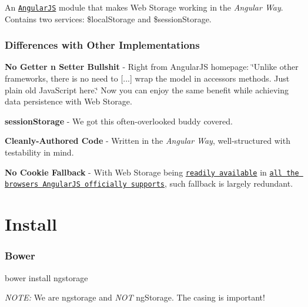 \href{https://travis-ci.org/gsklee/ngStorage}{\tt } \href{https://david-dm.org/gsklee/ngStorage}{\tt } \href{https://david-dm.org/gsklee/ngStorage#info=devDependencies}{\tt }

An \href{https://github.com/angular/angular.js}{\tt Angular\+JS} module that makes Web Storage working in the {\itshape Angular Way}. Contains two services\+: {\ttfamily \$local\+Storage} and {\ttfamily \$session\+Storage}.

\subsubsection*{Differences with Other Implementations}


\begin{DoxyItemize}
\item {\bfseries No Getter \textquotesingle{}n\textquotesingle{} Setter Bullshit} -\/ Right from Angular\+JS homepage\+: \char`\"{}\+Unlike other frameworks, there is no need to \mbox{[}...\mbox{]} wrap the model in accessors methods. Just plain old Java\+Script here.\char`\"{} Now you can enjoy the same benefit while achieving data persistence with Web Storage.
\item {\bfseries session\+Storage} -\/ We got this often-\/overlooked buddy covered.
\item {\bfseries Cleanly-\/\+Authored Code} -\/ Written in the {\itshape Angular Way}, well-\/structured with testability in mind.
\item {\bfseries No Cookie Fallback} -\/ With Web Storage being \href{http://caniuse.com/namevalue-storage}{\tt readily available} in \href{http://docs.angularjs.org/misc/faq#canidownloadthesourcebuildandhosttheangularjsenvironmentlocally}{\tt all the browsers Angular\+JS officially supports}, such fallback is largely redundant.
\end{DoxyItemize}

\section*{Install }

\subsubsection*{Bower}


\begin{DoxyCode}
bower install ngstorage
\end{DoxyCode}


{\itshape N\+O\+TE\+:} We are {\ttfamily ngstorage} and {\itshape N\+OT} {\ttfamily ng\+Storage}. The casing is important!


